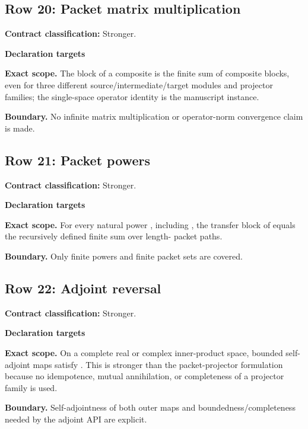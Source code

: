 \subsection{Row 20: Packet matrix multiplication}
\label{row:20}
\textbf{Contract classification:} Stronger.
\par\smallskip\textbf{Declaration targets}\par
{\small\noindent{}\par}
{\small\noindent{}\par}
{\small\noindent{}\par}
\medskip\noindent\textbf{Exact scope.} The block of a composite is the finite sum of composite blocks, even for three different source/intermediate/target modules and projector families; the single-space operator identity is the manuscript instance.
\par\smallskip\noindent\textbf{Boundary.} No infinite matrix multiplication or operator-norm convergence claim is made.
\medskip
\subsection{Row 21: Packet powers}
\label{row:21}
\textbf{Contract classification:} Stronger.
\par\smallskip\textbf{Declaration targets}\par
{\small\noindent{}\par}
\medskip\noindent\textbf{Exact scope.} For every natural power , including , the transfer block of  equals the recursively defined finite sum over length- packet paths.
\par\smallskip\noindent\textbf{Boundary.} Only finite powers and finite packet sets are covered.
\medskip
\subsection{Row 22: Adjoint reversal}
\label{row:22}
\textbf{Contract classification:} Stronger.
\par\smallskip\textbf{Declaration targets}\par
{\small\noindent{}\par}
\medskip\noindent\textbf{Exact scope.} On a complete real or complex inner-product space, bounded self-adjoint maps satisfy . This is stronger than the packet-projector formulation because no idempotence, mutual annihilation, or completeness of a projector family is used.
\par\smallskip\noindent\textbf{Boundary.} Self-adjointness of both outer maps and boundedness/completeness needed by the adjoint API are explicit.
\medskip
